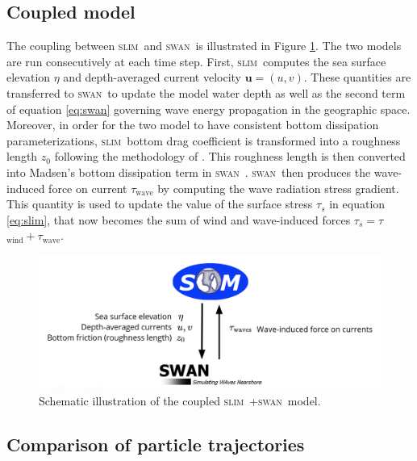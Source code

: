 \documentclass[11pt,a4paper]{article}
\newcommand{\slim}{\textsc{slim}\ }
\newcommand{\swan}{\textsc{swan}\ }
\begin{document}
\subsection{Coupled model}
The coupling between \slim and \swan is illustrated in Figure \ref{fig:coupling}. The two models are run consecutively at each time step. First, \slim computes the sea surface elevation $\eta$ and depth-averaged current velocity $\mathbf{u}=(u,v)$. These quantities are transferred to \swan to update the model water depth as well as the second term of equation \ref{eq:swan} governing wave energy propagation in the geographic space. Moreover, in order for the two model to have consistent bottom dissipation parameterizations, \slim bottom drag coefficient is transformed into a roughness length $z_0$ following the methodology of \cite{dietrich2011hurricane}. This roughness length is then converted into Madsen's bottom dissipation term in \swan. \swan then produces the wave-induced force on current {\boldmath$\tau$}$_\text{wave}$ by computing the wave radiation stress gradient. This quantity is used to update the value of the surface stress {\boldmath$\tau$}$_s$ in equation \ref{eq:slim}, that now becomes the sum of wind and wave-induced forces {\boldmath$\tau$}$_s=${\boldmath$\tau$}$_\text{wind}+${\boldmath$\tau$}$_\text{wave}$.
\begin{figure}
    \centering
    \includegraphics[width=.95\textwidth]{fig/coupling.png}
    \caption{Schematic illustration of the coupled \slim+\swan model.}
    \label{fig:coupling}
\end{figure}

\subsection{Comparison of particle trajectories}
\end{document}
